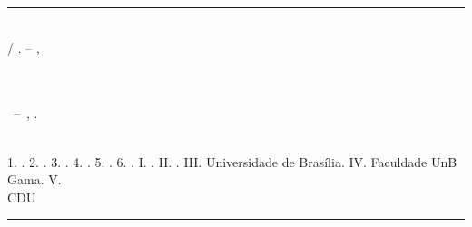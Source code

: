 \begin{fichacatalografica}
	\vspace*{\fill}					      %
	\hrule							          %
	\begin{center}					      %
	\begin{minipage}[c]{12.5cm}		%

	\imprimirautor\\

	\hspace{0.5cm} \imprimirtitulo / \imprimirautor. --
	\imprimirlocal, \imprimirdata\\

	\hspace{0.5cm} \imprimirorientadorRotulo~\imprimirorientador\\

	\hspace{0.5cm} \imprimircoorientadorRotulo~\imprimircoorientador\\

	\hspace{0.5cm}
	\parbox[t]{\textwidth}{\imprimirtipotrabalho~--~\imprimirinstituicao,
	\imprimirdata.}\\

	\hspace{0.5cm}
		1. \imprimirpalavrachaveum.
		2. \imprimirpalavrachavedois.
		3. \imprimirpalavrachavetres.
		4. \imprimirpalavrachavequatro.
		5. \imprimirpalavrachavecinco.
		6. \imprimirpalavrachaveseis.
		I. \imprimirorientador.
		II. \imprimircoorientador.
    III. Universidade de Brasília.
		IV. Faculdade UnB Gama.
		V. \imprimirtitulo\\

	\hspace{8.75cm} CDU \nomecdu\\

	\end{minipage}
	\end{center}
	\hrule
\end{fichacatalografica}
